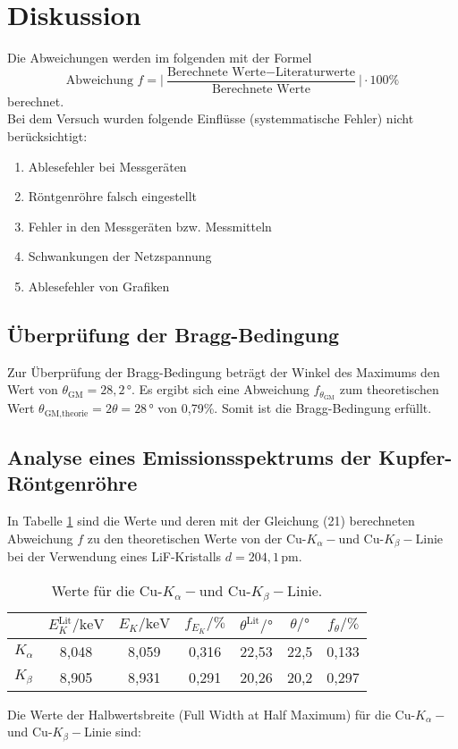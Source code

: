\section{Diskussion}
\label{sec:Diskussion}
Die Abweichungen werden im folgenden mit der Formel
\begin{equation}
    \text{Abweichung $f$} = \Big\vert\frac{\text{Berechnete Werte} - \text{Literaturwerte}}{\text{Berechnete Werte}}\Big\vert \cdot 100 \%
\end{equation} berechnet.\\
Bei dem Versuch wurden folgende Einflüsse (systemmatische Fehler) nicht berücksichtigt:
\begin{enumerate}
    \item Ablesefehler bei Messgeräten
    \item Röntgenröhre falsch eingestellt
    \item Fehler in den Messgeräten bzw. Messmitteln
    \item Schwankungen der Netzspannung
    \item Ablesefehler von Grafiken
\end{enumerate}

\subsection{Überprüfung der Bragg-Bedingung}
Zur Überprüfung der Bragg-Bedingung beträgt der Winkel des Maximums den Wert von $\theta_\text{GM}=28,2\,\mathrm{°}$.
Es ergibt sich eine Abweichung $f_{\theta_\text{GM}}$ zum theoretischen Wert $\theta_\text{GM,theorie}=2\theta=28\,\mathrm{°}$ von 0,79\%. 
Somit ist die Bragg-Bedingung erfüllt.\\

\subsection{Analyse eines Emissionsspektrums der Kupfer-Röntgenröhre}
In Tabelle \ref{tab:Cuwerte} sind die Werte und deren mit der Gleichung (21) berechneten Abweichung $f$ zu den theoretischen Werte \cite{XT} von der Cu-$K_\alpha-$und Cu-$K_\beta-$Linie bei der Verwendung eines LiF-Kristalls \(d=204,1\, \mathrm{pm}\).
\begin{table}[H]
    \centering
    \caption{Werte für die Cu-$K_\alpha-$und Cu-$K_\beta-$Linie.}
    \label{tab:Cuwerte}
    \begin{tabular}{|l  ||c|c|c ||c|c|c| }
        \toprule
        {} &  $E{_K ^\text{Lit}}/\mathrm{keV} $ & $E{_K}/\mathrm{keV} $   & $f_{E_K}/\mathrm{\%}$ &     $\theta^\text{Lit}/\mathrm{°}$    &    $\theta/\mathrm{°}$  &  $f_{\theta}/\mathrm{\%}$ \\
        \midrule
        $K_{\alpha }$ &8,048&8,059&0,316&22,53&22,5&0,133\\
        $K_{\beta}$&8,905&8,931&0,291&20,26&20,2&0,297\\
        \bottomrule
        \end{tabular}
\end{table}
Die Werte der Halbwertsbreite (Full Width at Half Maximum) für die Cu-$K_\alpha-$ und Cu-$K_\beta-$Linie sind:\\

